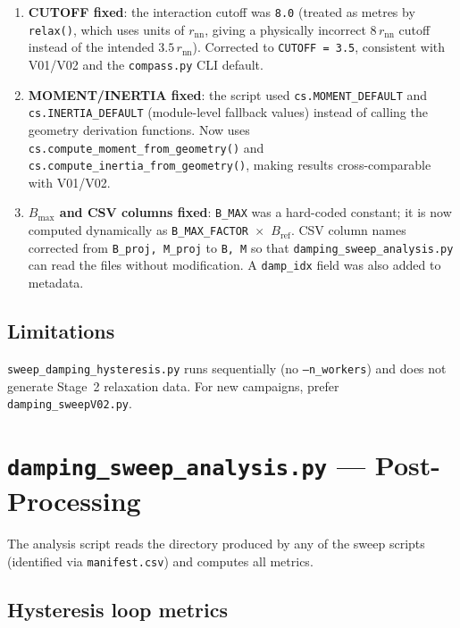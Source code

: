\documentclass[11pt,a4paper]{article}
\newcommand{\code}[1]{\texttt{#1}}
\newcommand{\file}[1]{\texttt{#1}}
\newcommand{\param}[1]{\texttt{--#1}}
\begin{document}
\begin{enumerate}
  \item \textbf{CUTOFF fixed}: the interaction cutoff was \texttt{8.0} (treated
    as metres by \code{relax()}, which uses units of $r_{\mathrm{nn}}$, giving
    a physically incorrect $8\,r_{\mathrm{nn}}$ cutoff instead of the intended
    $3.5\,r_{\mathrm{nn}}$).  Corrected to \texttt{CUTOFF = 3.5}, consistent
    with V01/V02 and the \texttt{compass.py} CLI default.

  \item \textbf{MOMENT/INERTIA fixed}: the script used
    \code{cs.MOMENT\_DEFAULT} and \code{cs.INERTIA\_DEFAULT} (module-level
    fallback values) instead of calling the geometry derivation functions.
    Now uses \code{cs.compute\_moment\_from\_geometry()} and
    \code{cs.compute\_inertia\_from\_geometry()}, making results
    cross-comparable with V01/V02.

  \item \textbf{$B_{\max}$ and CSV columns fixed}: \code{B\_MAX} was a hard-coded
    constant; it is now computed dynamically as \texttt{B\_MAX\_FACTOR~$\times$~$B_{\mathrm{ref}}$}.
    CSV column names corrected from \texttt{B\_proj, M\_proj} to \texttt{B, M}
    so that \file{damping\_sweep\_analysis.py} can read the files without
    modification.  A \texttt{damp\_idx} field was also added to metadata.
\end{enumerate}

\subsection{Limitations}

\file{sweep\_damping\_hysteresis.py} runs sequentially (no \param{n\_workers})
and does not generate Stage~2 relaxation data.  For new campaigns, prefer
\file{damping\_sweepV02.py}.

\section{\texttt{damping\_sweep\_analysis.py} --- Post-Processing}
\label{sec:analysis}

The analysis script reads the directory produced by any of the sweep scripts
(identified via \texttt{manifest.csv}) and computes all metrics.

\subsection{Hysteresis loop metrics}
\end{document}
